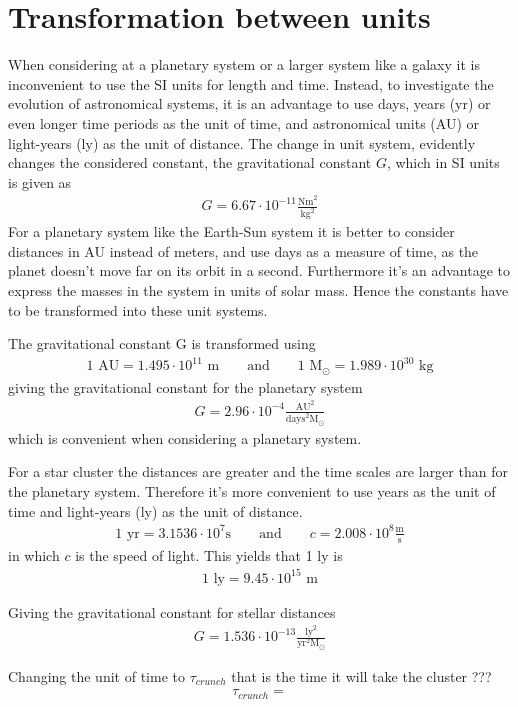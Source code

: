 \section{Transformation between units}
\label{sec:Conversion}
When considering at a planetary system or a larger system like a galaxy it is inconvenient to use the SI units for length and time.
Instead, to investigate the evolution of astronomical systems, it is an advantage to use days, years (yr) or even longer time periods as the unit of time, and astronomical units (AU) or light-years (ly) as the unit of distance.
The change in unit system, evidently changes the considered constant, the gravitational constant $G$, which in SI units is given as
\begin{align*}
	G = 6.67\cdot 10^{-11} \frac{\textrm{Nm}^2}{\textrm{kg}^2}
\end{align*}
For a planetary system like the Earth-Sun system it is better to consider distances in AU instead of meters, and use days as a measure of time, as the planet doesn't move far on its orbit in a second.
Furthermore it's an advantage to express the masses in the system in units of solar mass. 
Hence the constants have to be transformed into these unit systems. 

The gravitational constant G is transformed using
\begin{align*}
	1 \textrm{ AU} = 1.495\cdot10^{11} \textrm{ m}
	\qquad \text{and} \qquad
	1 \textrm{ M}_{\odot} = 1.989 \cdot 10^{30} \textrm{ kg}
\end{align*}
giving the gravitational constant for the planetary system
\begin{align*}
	G = 2.96\cdot 10^{-4} \frac{\textrm{AU}^2}{\textrm{days}^2 \textrm{M}_{\odot}}
\end{align*}
which is convenient when considering a planetary system.
 
For a star cluster the distances are greater and the time scales are larger than for the planetary system.
Therefore it's more convenient to use years as the unit of time and light-years (ly) as the unit of distance. 
\begin{align*}
	1 \textrm{ yr} = 3.1536\cdot10^7\textrm{s}
	\qquad \text{and} \qquad
	c = 2.008\cdot 10^8 \frac{\textrm{m}}{\textrm{s}}
\end{align*}
in which $c$ is the speed of light.
This yields that 1 ly is
\begin{align*}
	1 \textrm{ ly} = 9.45 \cdot 10^{15} \textrm{ m}
\end{align*}

Giving the gravitational constant for stellar distances 
\begin{align*}
	G = 1.536\cdot 10^{-13} \frac{\textrm{ly}^2}{\textrm{yr}^2 {\textrm{M}}_{\odot}}
\end{align*}

Changing the unit of time to $\tau_{crunch}$ that is the time it will take the cluster ???
\begin{align*}
\tau_{crunch} = 
\end{align*}